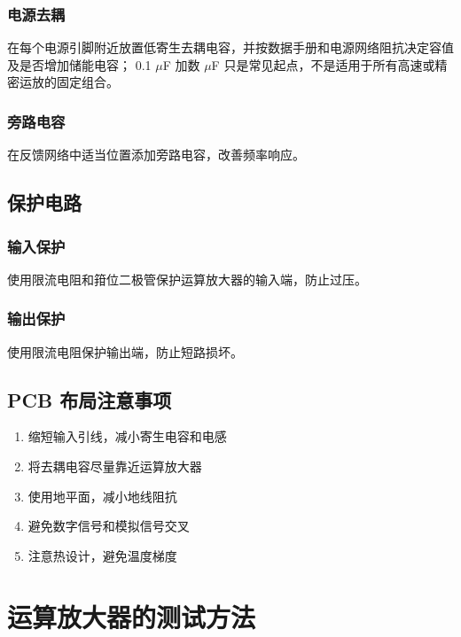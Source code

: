 \subsubsection{电源去耦}

在每个电源引脚附近放置低寄生去耦电容，并按数据手册和电源网络阻抗决定容值及是否增加储能电容；
0.1 $\mu$F 加数 $\mu$F 只是常见起点，不是适用于所有高速或精密运放的固定组合。

\subsubsection{旁路电容}

在反馈网络中适当位置添加旁路电容，改善频率响应。

\subsection{保护电路}

\subsubsection{输入保护}

使用限流电阻和箝位二极管保护运算放大器的输入端，防止过压。

\subsubsection{输出保护}

使用限流电阻保护输出端，防止短路损坏。

\subsection{PCB 布局注意事项}

\begin{enumerate}
  \item 缩短输入引线，减小寄生电容和电感
  \item 将去耦电容尽量靠近运算放大器
  \item 使用地平面，减小地线阻抗
  \item 避免数字信号和模拟信号交叉
  \item 注意热设计，避免温度梯度
\end{enumerate}

\section{运算放大器的测试方法}

